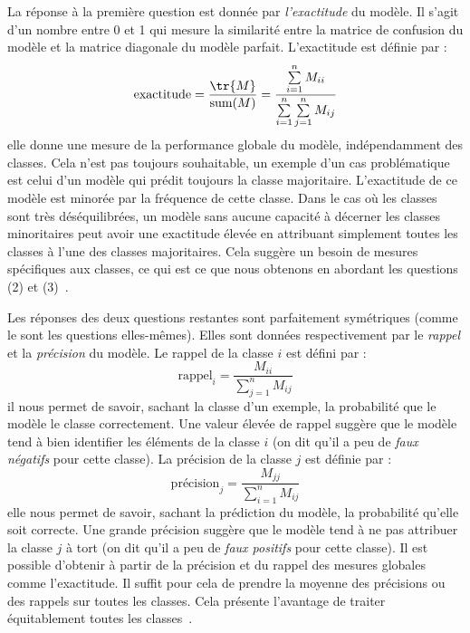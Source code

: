 La réponse à la première question est donnée par \emph{l'exactitude} du modèle.
Il s'agit d'un nombre entre 0 et 1 qui mesure la similarité entre 
la matrice de confusion du modèle et la matrice diagonale du modèle parfait.
L'exactitude est définie par :
\begin{equation}
    \label{eq.accuracy}
    \text{exactitude} =  \frac{\tr{M}}{\text{sum}(M)} 
                      = \frac{\sum\limits_{i=1}^n M_{ii}}{\sum\limits_{i=1}^n \sum\limits_{j=1}^n M_{ij}}
\end{equation}
elle donne une mesure de la performance globale du modèle, indépendamment des classes.
Cela n'est pas toujours souhaitable,
un exemple d'un cas problématique est celui d'un modèle qui prédit toujours la classe majoritaire.
L'exactitude de ce modèle est minorée par la fréquence de cette classe.
Dans le cas où les classes sont très déséquilibrées,
un modèle sans aucune capacité à décerner les classes minoritaires peut avoir une exactitude élevée
en attribuant simplement toutes les classes à l'une des classes majoritaires.
Cela suggère un besoin de mesures spécifiques aux classes,
ce qui est ce que nous obtenons en abordant les questions (2) et (3)~\cite{Raschka_Mirjalili_2017}.

Les réponses des deux questions restantes sont parfaitement symétriques (comme le sont les questions elles-mêmes).
Elles sont données respectivement par le \emph{rappel} et la \emph{précision} du modèle.
Le rappel de la classe \(i\) est défini par :
\begin{equation}
    \label{eq.recall}
    \text{rappel}_i = \frac{M_{ii}}{\sum\limits_{j=1}^n M_{ij}}
\end{equation}
il nous permet de savoir, sachant la classe d'un exemple, la probabilité que le modèle le classe correctement.
Une valeur élevée de rappel suggère que le modèle tend à bien identifier les éléments de la classe \(i\)
(on dit qu'il a peu de \emph{faux négatifs} pour cette classe).
La précision de la classe \(j\) est définie par :
\begin{equation}
    \label{eq.precision}
    \text{précision}_j = \frac{M_{jj}}{\sum\limits_{i=1}^n M_{ij}}
\end{equation}
elle nous permet de savoir, sachant la prédiction du modèle, la probabilité qu'elle soit correcte.
Une grande précision suggère que le modèle tend à ne pas attribuer la classe \(j\) à tort
(on dit qu'il a peu de \emph{faux positifs} pour cette classe).
Il est possible d'obtenir à partir de la précision et du rappel des mesures globales comme l'exactitude.
Il suffit pour cela de prendre la moyenne des précisions ou des rappels sur toutes les classes.
Cela présente l'avantage de traiter équitablement toutes les classes~\cite{Raschka_Mirjalili_2017}.


